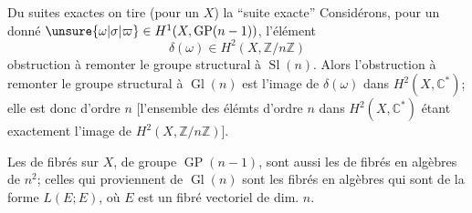 Du   suites exactes
on tire (pour un  $X$) la ``suite exacte''
Considérons, pour un  donné $\unsure{\omega|\sigma|\varpi}\in H^1(X,\operatorname{GP}(n-1))$, l'élément
\[
\delta(\omega)\in H^2(X,\mathbb{Z}/n\mathbb{Z})
\]
obstruction à remonter le groupe structural à $\operatorname{Sl}(n)$. Alors l'obstruction à remonter le groupe structural à $\operatorname{Gl}(n)$ est l'image de $\delta(\omega)$ dans $H^2(X,\mathbb{C}^*)$; elle est donc d'ordre $n$ [l'ensemble des élémts d'ordre $n$ dans $H^2(X,\mathbb{C}^*)$ étant exactement l'image de $H^2(X,\mathbb{Z}/n\mathbb{Z})$].

Les  de fibrés sur $X$, de groupe $\operatorname{GP}(n-1)$, sont aussi les  de fibrés en algèbres  de   $n^2$; celles qui proviennent de $\operatorname{Gl}(n)$ sont les fibrés en algèbres qui
sont de la forme $L(E;E)$, où $E$ est un fibré vectoriel de dim. $n$.

